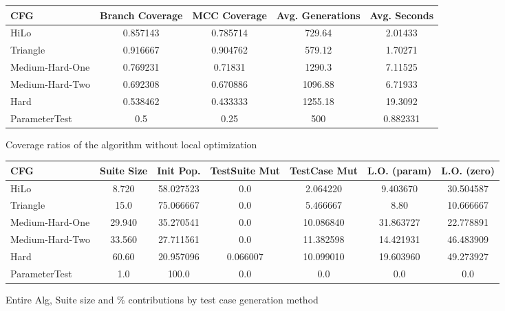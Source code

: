 \documentclass[runningheads]{llncs}
\begin{document}
\begin{figure}[h!]
	\begin{center}
		\begin{tabular}{| l | c | c | c | c |}
			\hline
			CFG & Branch Coverage & MCC Coverage & Avg. Generations & Avg. Seconds \\ \hline
			HiLo & 0.857143 & 0.785714 & 729.64 & 2.01433 \\ \hline
			Triangle & 0.916667 & 0.904762 & 579.12 & 1.70271 \\ \hline
			Medium-Hard-One & 0.769231 & 0.71831 & 1290.3 & 7.11525 \\ \hline
			Medium-Hard-Two & 0.692308 & 0.670886 & 1096.88 & 6.71933 \\ \hline
			Hard & 0.538462 & 0.433333 & 1255.18 & 19.3092 \\ \hline
			ParameterTest & 0.5 & 0.25 & 500 & 0.882331 \\ \hline
		\end{tabular}
	\end{center}
	\caption{Coverage ratios of the algorithm without local optimization}
	\label{fig:finalResultNoLOCoverage}
\end{figure}

\begin{figure}[h!]
	\begin{center}
		\begin{tabular}{| l | c || c | c | c | c | c |}
			\hline
			CFG             & Suite Size & Init Pop. & TestSuite Mut & TestCase Mut & L.O. (param)  & L.O. (zero) \\ \hline
			HiLo & 8.720 & 58.027523 & 0.0 & 2.064220 & 9.403670 & 30.504587 \\ \hline 
			Triangle & 15.0 & 75.066667 & 0.0 & 5.466667 & 8.80 & 10.666667 \\ \hline 
			Medium-Hard-One & 29.940 & 35.270541 & 0.0 & 10.086840 & 31.863727 & 22.778891 \\ \hline 
			Medium-Hard-Two & 33.560 & 27.711561 & 0.0 & 11.382598 & 14.421931 & 46.483909 \\ \hline 
			Hard & 60.60 & 20.957096 & 0.066007 & 10.099010 & 19.603960 & 49.273927 \\ \hline 
			ParameterTest & 1.0 & 100.0 & 0.0 & 0.0 & 0.0 & 0.0 \\ \hline 
		\end{tabular}
	\end{center}
	\caption{Entire Alg, Suite size and \% contributions by test case generation method}
	\label{fig:finalResultEntireAlgContrib}
\end{figure}
\end{document}
